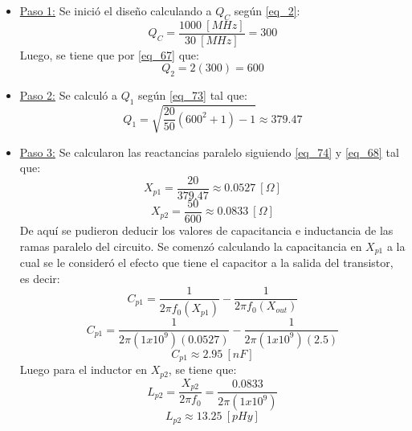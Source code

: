\documentclass[conference]{IEEEtran}
\begin{document}
\begin{itemize}
    \item \underline{Paso 1:} Se inició el diseño calculando a $Q_{C}$ según \eqref{eq_2}:
    \begin{equation}
        Q_{C} = \frac{1000 \ [MHz]}{30 \ [MHz]} = 300
        \label{eq_78}
    \end{equation}
    Luego, se tiene que por \eqref{eq_67} que:
    \begin{equation}
        Q_{2} = 2(300) = 600
        \label{eq_79}
    \end{equation}

    \item \underline{Paso 2:} Se calculó a $Q_{1}$ según \eqref{eq_73} tal que:
    \begin{equation}
        Q_{1} = \sqrt{\frac{20}{50}(600^{2}+1)-1} \approx 379.47
        \label{eq_80}
    \end{equation}

    \item \underline{Paso 3:} Se calcularon las reactancias paralelo siguiendo \eqref{eq_74} y \eqref{eq_68} tal que:
    \begin{equation}
        X_{p1} = \frac{20}{379.47} \approx 0.0527 \ [\Omega]
        \label{eq_81}
    \end{equation}
    \begin{equation}
        X_{p2} = \frac{50}{600} \approx 0.0833 \ [\Omega]
        \label{eq_82}
    \end{equation}
    De aquí se pudieron deducir los valores de capacitancia e inductancia de las ramas paralelo del circuito. Se comenzó calculando la capacitancia en $X_{p1}$ a la cual se le consideró el efecto que tiene el capacitor a la salida del transistor, es decir:
    \begin{equation}
        C_{p1} =  \frac{1}{2\pi f_{0}(X_{p1})} - \frac{1}{2\pi f_{0}(X_{out})}
        \label{eq_83}
    \end{equation}
    \begin{equation}
        C_{p1} = \frac{1}{2\pi(1x10^{9})(0.0527)} - \frac{1}{2\pi(1x10^{9})(2.5)}
        \label{eq_84}
    \end{equation}
    \begin{equation}
        C_{p1} \approx  2.95 \ [nF]
        \label{eq_85}
    \end{equation}
    Luego para el inductor en $X_{p2}$, se tiene que:
    \begin{equation}
        L_{p2} = \frac{X_{p2}}{2\pi f_{0}} = \frac{0.0833}{2\pi(1x10^{9})}
        \label{eq_86}
    \end{equation}
    \begin{equation}
        L_{p2} \approx  13.25 \ [pHy]
        \label{eq_87}
    \end{equation}


\end{itemize}
\end{document}
